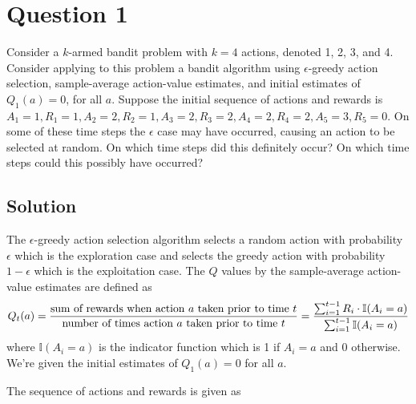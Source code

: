 \section*{Question 1}

Consider a \( k \)-armed bandit problem with \( k = 4 \) actions, denoted 1, 2, 3, and 4.
Consider applying to this problem a bandit algorithm using \( \epsilon \)-greedy action selection, sample-average action-value estimates, and initial estimates of \( Q_{1}(a) = 0 \), for all \( a \).
Suppose the initial sequence of actions and rewards is \( A_{1} = 1, R_{1} = 1, A_{2} = 2, R_{2} = 1, A_{3} = 2, R_{3} = 2, A_{4} = 2, R_{4} = 2, A_{5} = 3, R_{5} = 0 \).
On some of these time steps the \( \epsilon \) case may have occurred, causing an action to be selected at random.
On which time steps did this definitely occur?
On which time steps could this possibly have occurred?

\subsection*{Solution}

The \( \epsilon \)-greedy action selection algorithm selects a random action with probability \( \epsilon \) which is the exploration case and selects the greedy action with probability \( 1 - \epsilon \) which is the exploitation case.
The \( Q \) values by the sample-average action-value estimates are defined as
\[
    Q_{t}(a) = \frac{\text{sum of rewards when action \( a \) taken prior to time \( t \)}}{\text{number of times action \( a \) taken prior to time \( t \)}}
    =
    \frac{\sum_{i=1}^{t-1} R_{i} \cdot \mathbb{I}(A_{i} = a)}{\sum_{i=1}^{t-1} \mathbb{I}(A_{i} = a)}
\]
where \( \mathbb{I}(A_{i} = a) \) is the indicator function which is 1 if \( A_{i} = a \) and 0 otherwise.
We're given the initial estimates of \( Q_{1}(a) = 0 \) for all \( a \).

The sequence of actions and rewards is given as

